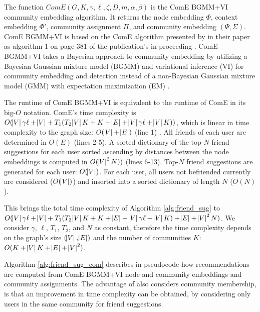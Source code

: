 \documentclass[conference]{IEEEtran}
\begin{document}
The function $ComE(G, K, \gamma, \ell, \zeta, D, m, \alpha, \beta)$ is the ComE BGMM+VI community embedding algorithm. It returns the node embedding $\Phi$, context embedding $\Phi'$, community assignment $\Pi$, and community embedding $(\Psi,\Sigma)$. ComE BGMM+VI is based on the ComE algorithm presented by \citeauthor{ComE} in their paper  as algorithm 1 on page 381 of the publication's in-proceeding \cite{ComE}. ComE BGMM+VI takes a Bayesian approach to community embedding by utilizing  a Bayesian Gaussian mixture model (BGMM) and variational inference (VI) for community embedding and detection instead of a non-Bayesian Gaussian mixture model (GMM) with expectation maximization (EM) \cite{ComE_BGMM_GH}. %

The runtime of ComE BGMM+VI is equivalent to the runtime of ComE in its big-$O$ notation. ComE's time complexity is $O(\abs{V}\gamma\ell + \abs{V} + T_1 (T_2\abs{V}K + K + \abs{E} + \abs{V}\gamma\ell + \abs{V}K))$, which is linear in time complexity to the graph size: $O(\abs{V} + \abs{E})$ (line 1) \cite{ComE}. All friends of each user are determined in $O(E)$ (lines 2-5). A sorted dictionary of the top-$N$ friend suggestions for each user sorted ascending by distances between the node embeddings is computed in $O(\abs{V}^2N))$ (lines 6-13). Top-$N$ friend suggestions are generated for each user: $O(\abs{V})$. For each user, all users not befriended currently are considered ($O(\abs{V})$) and inserted into a sorted dictionary of length $N$ ($O(N)$).

This brings the total time complexity of Algorithm \ref{alg:friend_sug} to $O(\abs{V}\gamma\ell + \abs{V} + T_1 (T_2\abs{V}K + K + \abs{E} + \abs{V}\gamma\ell + \abs{V}K) + \abs{E} + \abs{V}^2N)$. We consider $\gamma$, $\ell$, $T_1$, $T_2$, and $N$ as constant, therefore the time complexity depends on the graph's size $(\abs{V}, \abs{E})$ and the number of communities $K$: $O(K + \abs{V}K + \abs{E} + \abs{V}^2)$.

Algorithm \ref{alg:friend_sug_com} describes in pseudocode how recommendations are computed from ComE BGMM+VI node and community embeddings and community assignments. The advantage of also considers community membership, is that an improvement in time complexity can be obtained, by considering only users in the same community for friend suggestions.
\end{document}
